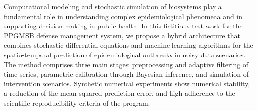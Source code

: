 \documentclass[diss]{classPPGMSB}   %
\begin{document}

\begin{newAbstract}
	Computational modeling and stochastic simulation of biosystems play a fundamental role in understanding complex epidemiological phenomena and in supporting decision-making in public health. In this fictitious test work for the PPGMSB defense management system, we propose a hybrid architecture that combines stochastic differential equations and machine learning algorithms for the spatio-temporal prediction of epidemiological outbreaks in noisy data scenarios. The method comprises three main stages: preprocessing and adaptive filtering of time series, parametric calibration through Bayesian inference, and simulation of intervention scenarios. Synthetic numerical experiments show numerical stability, a reduction of the mean squared prediction error, and high adherence to the scientific reproducibility criteria of the program.
\end{newAbstract}


\listaDeSimbolos
\listaDeAbreviacoes
\listaDeIlustracoes
\listaDeTabelas
\listaDeAlgoritmos

\pagestyle{empty} %

\setlength{\beforechapskip}{-50pt}
\tableofcontents*

\clearpage %
\pagestyle{plain} %
\setcounter{page}{1} %


\mainmatter
\pagestyle{ppgmsbPages}
\end{document}
